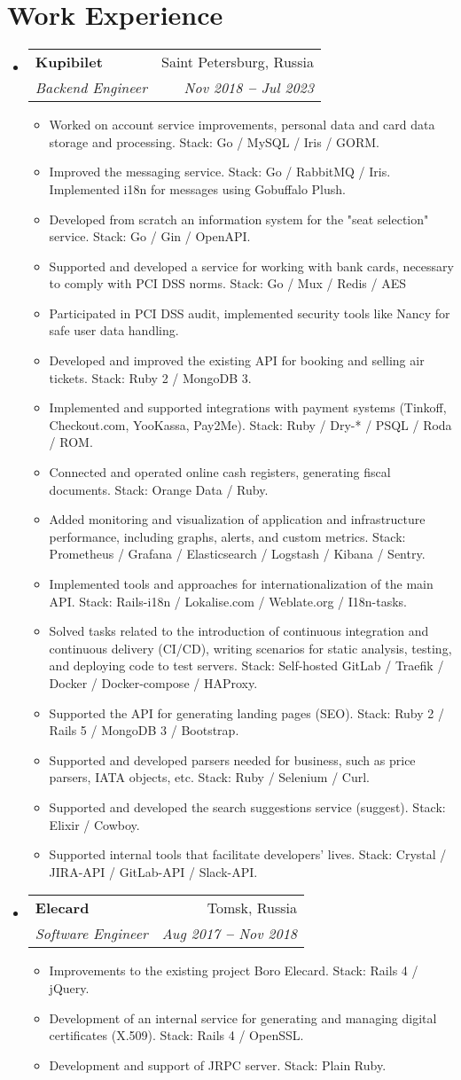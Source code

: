 \documentclass[letterpaper,11pt]{article}
\makeatletter
\newcommand{\resumeItem}[1]{
  \item\small{
    {#1 \vspace{-2pt}}
  }
}
\newcommand{\resumeSubheading}[4]{
  \vspace{-2pt}\item
    \begin{tabular*}{0.97\textwidth}[t]{l@{\extracolsep{\fill}}r}
      \textbf{#1} & #2 \\
      \textit{\small#3} & \textit{\small #4} \\
    \end{tabular*}\vspace{-7pt}
}
\newcommand{\resumeSubHeadingListStart}{\begin{itemize}[leftmargin=0.15in, label={}]}
\newcommand{\resumeSubHeadingListEnd}{\end{itemize}}
\newcommand{\resumeItemListStart}{\begin{itemize}}
\newcommand{\resumeItemListEnd}{\end{itemize}\vspace{-5pt}}
\makeatother
\begin{document}
\section{Work Experience}
  \vspace{3pt}
  \resumeSubHeadingListStart
    \resumeSubheading
      {Kupibilet}{Saint Petersburg, Russia}
      {Backend Engineer}{Nov 2018 \textbf{--} Jul 2023}
        \resumeItemListStart
          \resumeItem{Worked on account service improvements, personal data and card data storage and processing. Stack: Go / MySQL / Iris / GORM.}
          \resumeItem{Improved the messaging service. Stack: Go / RabbitMQ / Iris. Implemented i18n for messages using Gobuffalo Plush.}
          \resumeItem{Developed from scratch an information system for the "seat selection" service. Stack: Go / Gin / OpenAPI.}
          \resumeItem{Supported and developed a service for working with bank cards, necessary to comply with PCI DSS norms. Stack: Go / Mux / Redis / AES}
          \resumeItem{Participated in PCI DSS audit, implemented security tools like Nancy for safe user data handling.}
          \resumeItem{Developed and improved the existing API for booking and selling air tickets. Stack: Ruby 2 / MongoDB 3.}
          \resumeItem{Implemented and supported integrations with payment systems (Tinkoff, Checkout.com, YooKassa, Pay2Me). Stack: Ruby / Dry-* / PSQL / Roda / ROM.}
          \resumeItem{Connected and operated online cash registers, generating fiscal documents. Stack: Orange Data / Ruby.}
          \resumeItem{Added monitoring and visualization of application and infrastructure performance, including graphs, alerts, and custom metrics. Stack: Prometheus / Grafana / Elasticsearch / Logstash / Kibana / Sentry.}
          \resumeItem{Implemented tools and approaches for internationalization of the main API. Stack: Rails-i18n / Lokalise.com / Weblate.org / I18n-tasks.}
          \resumeItem{Solved tasks related to the introduction of continuous integration and continuous delivery (CI/CD), writing scenarios for static analysis, testing, and deploying code to test servers. Stack: Self-hosted GitLab / Traefik / Docker / Docker-compose / HAProxy.}
          \resumeItem{Supported the API for generating landing pages (SEO). Stack: Ruby 2 / Rails 5 / MongoDB 3 / Bootstrap.}
          \resumeItem{Supported and developed parsers needed for business, such as price parsers, IATA objects, etc. Stack: Ruby / Selenium / Curl.}
          \resumeItem{Supported and developed the search suggestions service (suggest). Stack: Elixir / Cowboy.}
          \resumeItem{Supported internal tools that facilitate developers' lives. Stack: Crystal / JIRA-API / GitLab-API / Slack-API.}
        \resumeItemListEnd
    \resumeSubheading
      {Elecard}{Tomsk, Russia}
      {Software Engineer}{Aug 2017 \textbf{--} Nov 2018}
        \resumeItemListStart
          \resumeItem{Improvements to the existing project Boro Elecard. Stack: Rails 4 / jQuery.}
          \resumeItem{Development of an internal service for generating and managing digital certificates (X.509). Stack: Rails 4 / OpenSSL.}
          \resumeItem{Development and support of JRPC server. Stack: Plain Ruby.}
        \resumeItemListEnd
  \resumeSubHeadingListEnd
\end{document}

